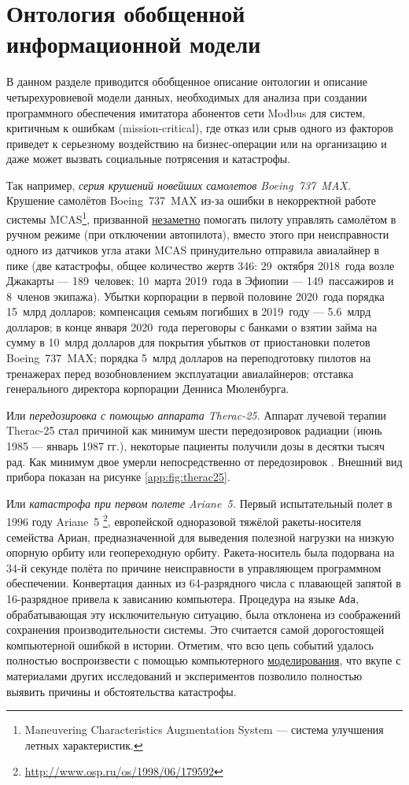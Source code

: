 \chapter{Онтология обобщенной информационной модели}
В данном разделе приводится обобщенное описание онтологии и описание четырехуровневой модели данных,
необходимых для анализа при создании программного обеспечения имитатора абонентов сети Modbus
для систем, критичным к ошибкам (mission-critical),
где отказ или срыв одного из факторов приведет к серьезному воздействию на бизнес-операции или на организацию
и даже может вызвать социальные потрясения и катастрофы.

Так например, \textit{серия крушений новейших самолетов Boeing~737~MAX.}
Крушение самолётов Boeing~737~MAX из-за ошибки в некорректной работе системы
MCAS\footnote{Maneuvering Characteristics Augmentation System --- система улучшения летных характеристик.},
призванной \underline{незаметно} помогать пилоту управлять самолётом в ручном режиме (при отключении автопилота),
вместо этого при неисправности одного из датчиков угла атаки MCAS принудительно отправила авиалайнер в пике
(две катастрофы, общее количество жертв 346:
    29~октября 2018~года возле Джакарты --- 189~человек;
    10~марта 2019~года в Эфиопии --- 149~пассажиров и 8~членов экипажа).
Убытки корпорации в первой половине 2020~года порядка 15~млрд долларов;
компенсация семьям погибших в 2019~году --- 5.6~млрд долларов;
в конце января 2020~года переговоры с банками о взятии займа на сумму в 10~млрд долларов для покрытия убытков от приостановки полетов Boeing~737~MAX;
порядка 5~млрд долларов на переподготовку пилотов на тренажерах перед возобновлением эксплуатации авиалайнеров;
отставка генерального директора корпорации Денниса Мюленбурга.

Или \textit{передозировка с помощью аппарата Therac-25.}
Аппарат лучевой терапии Therac-25 стал причиной как минимум шести передозировок радиации (июнь 1985 --- январь 1987 гг.),
некоторые пациенты получили дозы в десятки тысяч рад. Как минимум двое умерли непосредственно от передозировок \cite{journal:computer:1993:therac25}.
Внешний вид прибора показан на рисунке \ref{app:fig:therac25}.

Или \textit{катастрофа при первом полете Ariane~5.}
Первый испытательный полет в 1996 году Ariane~5
\cite{journal:open_system:1998_adjaev}\footnote{\url{http://www.osp.ru/os/1998/06/179592}},
европейской одноразовой тяжёлой ракеты-носителя семейства Ариан,
предназначенной для выведения полезной нагрузки на низкую опорную орбиту или геопереходную орбиту. 
Ракета-носитель была подорвана на 34-й секунде полёта по причине неисправности в управляющем программном обеспечении.
Конвертация данных из 64-разрядного числа с плавающей запятой в 16-разрядное привела к зависанию компьютера.
Процедура на языке \texttt{Ada}, обрабатывающая эту исключительную ситуацию, была отклонена из соображений сохранения производительности системы.
Это считается самой дорогостоящей компьютерной ошибкой в истории.
Отметим, что всю цепь событий удалось полностью воспроизвести с помощью компьютерного \underline{моделирования},
что вкупе с материалами других исследований и экспериментов позволило полностью выявить причины и обстоятельства катастрофы.

